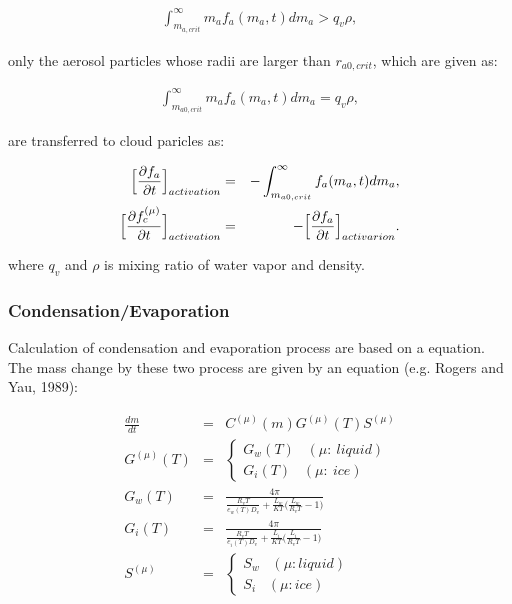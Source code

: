 \begin{eqnarray}
\int_{m_{a,crit}}^{\infty}m_{a}f_{a}(m_{a},t)dm_{a} > q_{v}\rho,\label{s10-6}
\end{eqnarray}

only the aerosol particles whose radii are larger than $r_{a0,crit}$, which are given as:

\begin{eqnarray}
\int_{m_{a0,crit}}^{\infty}m_{a}f_{a}(m_{a},t)dm_{a} = q_{v}\rho,\label{s10-7}
\end{eqnarray}


are transferred to cloud paricles as:

\begin{eqnarray}
\Bigl[\frac{\partial f_{a}}{\partial t}\Bigr]_{activation}&=&-\int_{m_{a0,crit}}^{\infty}f_{a}(m_{a},t)dm_{a},\label{s10-8}\\
\Bigl[\frac{\partial f_{c}^{(\mu)}}{\partial t}\Bigr]_{activation}&=&-\Bigl[\frac{\partial f_{a}}{\partial t}\Bigr]_{activarion}.\label{s10-9}
\end{eqnarray}

where $q_{v}$ and $\rho$ is mixing ratio of water vapor and density.

\subsubsection{Condensation/Evaporation}
Calculation of condensation and evaporation process are based on a equation. The mass change by these two process are given by an equation (e.g. Rogers and Yau, 1989):

\begin{eqnarray}
\frac{dm}{dt}&=&C^{(\mu)}(m)G^{(\mu)}(T)S^{(\mu)}\\
G^{(\mu)}(T)&=&
\left\{
\begin{array}{l}
G_{w}(T)\;\;\;(\mu : \:liquid)\\
G_{i}(T)\;\;\;(\mu : \:ice)
\end{array}\right. \nonumber\\
G_{w}(T)&=&\frac{4\pi}{\frac{R_{v}T}{e_{w}(T)D_{v}}+\frac{L_{w}}{KT}\bigl( \frac{L_{w}}{R_{v}T}-1\Bigr )}\nonumber\\
G_{i}(T)&=&\frac{4\pi}{\frac{R_{v}T}{e_{i}(T)D_{v}}+\frac{L_{i}}{KT}\bigl( \frac{L_{i}}{R_{v}T}-1\Bigr )}\nonumber\\
S^{(\mu)}&=&
\left\{
\begin{array}{l}
S_{w}\;\;\;(\mu : liquid)\\
S_{i}\;\;\;(\mu : ice)
\end{array}\right.\nonumber
\end{eqnarray}

